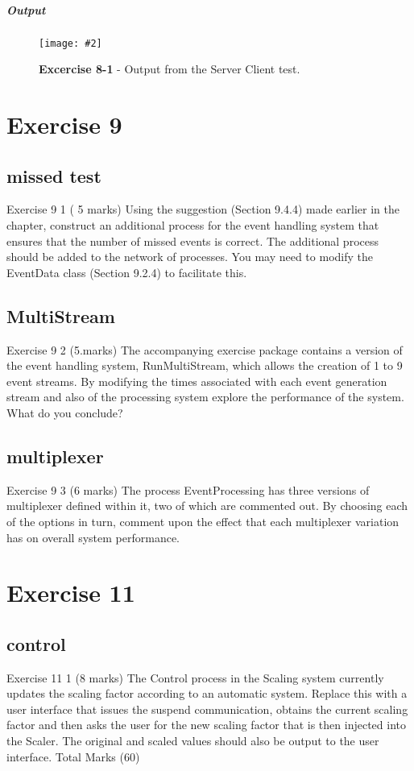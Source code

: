 \documentclass[10pt, a4paper]{article}
\newcommand{\figuremacro}[5]{
    \begin{figure}[#1]
        \centering
        \texttt{[image: \#2]}
        \caption[#3]{\textbf{#3}#4}
        \label{fig:#2}
    \end{figure}
}
\begin{document}
   \subparagraph{Output}
   
  	\figuremacro{H}{testClient}{Excercise 8-1}{ -  Output from the Server Client test.}{0.3}
   
   \setcounter{section}{9}
   \section*{Exercise 9}
   
   \setcounter{subsection}{0}
   \subsection{missed test}
   
   Exercise 9 1   ( 5 marks)
   Using the suggestion (Section 9.4.4) made earlier in the chapter, construct an additional process for the event handling system that ensures that the number of missed events is correct.  The additional process should be added to the network of processes.  You may need to modify the EventData class (Section 9.2.4) to facilitate this.
   
   \subsection{MultiStream}
   Exercise 9 2   (5.marks)
   The accompanying exercise package contains a version of the event handling system, RunMultiStream, which allows the creation of 1 to 9 event streams.  By modifying the times associated with each event generation stream and also of the processing system explore the performance of the system.  What do you conclude?
   
   \subsection{multiplexer}
   Exercise 9 3   (6 marks)
   The process EventProcessing has three versions of multiplexer defined within it, two of which are commented out.  By choosing each of the options in turn, comment upon the effect that each multiplexer variation has on overall system performance.
   
   	\setcounter{section}{11}
   \section*{Exercise 11}
   
   \setcounter{subsection}{0}

   \subsection{control}
   Exercise 11 1   (8 marks)
   The Control process in the Scaling system currently updates the scaling factor according to an automatic system.  Replace this with a user interface that issues the suspend communication, obtains the current scaling factor and then asks the user for the new scaling factor that is then injected into the Scaler.  The original and scaled values should also be output to the user interface.
   Total Marks  (60)
   
	
\end{document}
